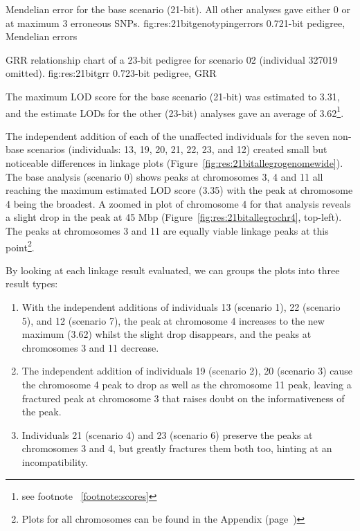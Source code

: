 	{Mendelian error for the base scenario (21-bit). All other analyses gave either 0 or at maximum 3 erroneous SNPs.}
	{fig:res:21bitgenotypingerrors}
	{0.7}{21-bit pedigree, Mendelian errors}

	{GRR relationship chart of a 23-bit pedigree for scenario 02 (individual 327019 omitted).}
	{fig:res:21bitgrr}
	{0.7}{23-bit pedigree, GRR}

The maximum LOD score for the base scenario (21-bit) was estimated to 3.31, and the estimate LODs for the other (23-bit) analyses gave an average of 3.62\footnote{see footnote ~\ref{footnote:scores}}. 

The independent addition of each of the unaffected individuals for the seven non-base scenarios (individuals: 13, 19, 20, 21, 22, 23, and 12) created small but noticeable differences in linkage plots (Figure~\ref{fig:res:21bitallegrogenomewide}). The base analysis (scenario 0) shows peaks at chromosomes 3, 4 and 11 all reaching the maximum estimated LOD score (3.35) with the peak at chromosome 4 being the broadest. A zoomed in plot of chromosome 4 for that analysis reveals a slight drop in the peak at 45 Mbp (Figure~\ref{fig:res:21bitallegrochr4}, top-left). The peaks at chromosomes 3 and 11 are equally viable linkage peaks at this point\footnote{Plots for all chromosomes can be found in the Appendix (page~\pageref{ref:app:21bitplots})}.

By looking at each linkage result evaluated, we can groups the plots into three result types:
\begin{enumerate}
\item{With the independent additions of individuals 13 (scenario 1),  22 (scenario 5), and 12 (scenario 7),  the peak at chromosome 4 increases to the new maximum (3.62) whilst the slight drop disappears, and the peaks at chromosomes 3 and 11 decrease.}
\item{The independent addition of individuals 19 (scenario 2), 20 (scenario 3) cause the chromosome 4 peak to drop as well as the chromosome 11 peak, leaving a fractured peak at chromosome 3 that raises doubt on the informativeness of the peak.}
\item{Individuals 21 (scenario 4) and 23 (scenario 6) preserve the peaks at chromosomes 3 and 4, but greatly fractures them both too, hinting at an incompatibility.}
\end{enumerate}

